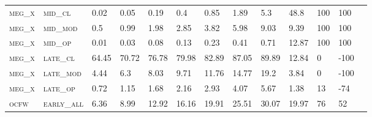 \begin{sidewaystable}[!htbp]
\begin{tabular}{@{}lllllllllllll@{}}
\footnotesize \textsc{meg\_x}      & \footnotesize \textsc{mid\_cl   }                & \footnotesize 0.02            & \footnotesize 0.05            & \footnotesize 0.19             & \footnotesize 0.4              & \footnotesize 0.85             & \footnotesize 1.89             & \footnotesize 5.3        & \footnotesize 48.8     & \footnotesize 100    & \footnotesize 100      \\
\footnotesize \textsc{meg\_x}      & \footnotesize \textsc{mid\_mod  }                & \footnotesize 0.5             & \footnotesize 0.99            & \footnotesize 1.98             & \footnotesize 2.85             & \footnotesize 3.82             & \footnotesize 5.98             & \footnotesize 9.03       & \footnotesize 9.39     & \footnotesize 100    & \footnotesize 100      \\
\footnotesize \textsc{meg\_x}      & \footnotesize \textsc{mid\_op   }                & \footnotesize 0.01            & \footnotesize 0.03            & \footnotesize 0.08             & \footnotesize 0.13             & \footnotesize 0.23             & \footnotesize 0.41             & \footnotesize 0.71       & \footnotesize 12.87    & \footnotesize 100    & \footnotesize 100      \\
\footnotesize \textsc{meg\_x}      & \footnotesize \textsc{late\_cl  }                & \footnotesize 64.45           & \footnotesize 70.72           & \footnotesize 76.78            & \footnotesize 79.98            & \footnotesize 82.89            & \footnotesize 87.05            & \footnotesize 89.89      & \footnotesize 12.84    & \footnotesize 0      & \footnotesize -100     \\
\footnotesize \textsc{meg\_x}      & \footnotesize \textsc{late\_mod }                & \footnotesize 4.44            & \footnotesize 6.3             & \footnotesize 8.03             & \footnotesize 9.71             & \footnotesize 11.76            & \footnotesize 14.77            & \footnotesize 19.2       & \footnotesize 3.84     & \footnotesize 0      & \footnotesize -100     \\
\footnotesize \textsc{meg\_x}      & \footnotesize \textsc{late\_op  }                & \footnotesize 0.72            & \footnotesize 1.15            & \footnotesize 1.68             & \footnotesize 2.16             & \footnotesize 2.93             & \footnotesize 4.07             & \footnotesize 5.67       & \footnotesize 1.38     & \footnotesize 13     & \footnotesize -74      \\
\footnotesize \textsc{ocfw}        & \footnotesize \textsc{early\_all}                & \footnotesize 6.36            & \footnotesize 8.99            & \footnotesize 12.92            & \footnotesize 16.16            & \footnotesize 19.91            & \footnotesize 25.51            & \footnotesize 30.07      & \footnotesize 19.97    & \footnotesize 76     & \footnotesize 52       \\

\end{tabular}
\end{sidewaystable}
